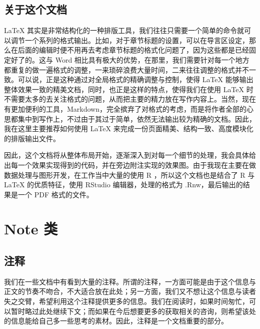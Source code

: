 \documentclass[color=green,mathpazo,titlestyle=hang]{elegantbook}\usepackage[]{graphicx}\usepackage[]{color}
\begin{document}
\section{关于这个文档}
\LaTeX{} 其实是非常结构化的一种排版工具，我们往往只需要一个简单的命令就可以调节一个系列的格式输出。比如，对于章节标题的设置，可以在导言区设定，那么在后面的编辑时便不用再去考虑章节标题的格式化问题了，因为这些都是已经固定好了的。这与 Word 相比具有极大的优势，在那里，我们需要针对每一个地方都重复的做一遍格式的调整，一来琐碎浪费大量时间，二来往往调整的格式并不一致。可以说，正是这种通过对全局格式的精确调整与控制，使得 \LaTeX{} 能够输出整体效果一致的精美文档，同时，也正是这样的特点，使得我们在使用 \LaTeX{} 时不需要太多的去关注格式的问题，从而把主要的精力放在写作内容上。当然，现在有更加便利的工具，Markdown，完全摈弃了对格式的考虑，而是将作者全部的心思都集中到写作上，不过由于其过于简单，依然无法输出较为精确的文档。因此，我在这里主要推荐如何使用 \LaTeX{} 来完成一份页面精美、结构一致、高度模块化的排版输出文件。

因此，这个文档将从整体布局开始，逐渐深入到对每一个细节的处理，我会具体给出每一个效果实现得到的代码，并在旁边附注实现的效果图。由于我现在主要在做数据处理与图形开发，在工作当中大量的使用 R ，所以这个文档也是结合了 R 与 \LaTeX{} 的优质特征，使用 RStudio 编辑器，处理的格式为 .Rnw，最后输出的结果是一个 PDF 格式的文件。

\chapter{Note 类}
\section{注释}
我们在一些文档中有看到大量的注释。所谓的注释，一方面可能是由于这个信息与正文的节奏不吻合，不大适合放在此处；另一方面，我们又不想让这个信息与读者失之交臂，希望利用这个注释提供更多的信息。我们在阅读时，如果时间匆忙，可以暂时略过此处继续下文；而如果在今后想要更多的获取相关的咨询，则希望该处的信息能给自己多一些思考的素材。因此，注释是一个文档重要的部分。
\end{document}
